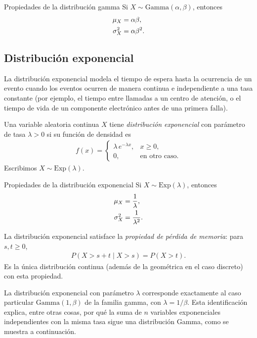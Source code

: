 {Propiedades de la distribución gamma} Si $X \sim \text{Gamma}(\alpha, \beta)$, entonces
\begin{align}
 \mu_X &= \alpha\beta, \\
 \sigma_X^2 &= \alpha\beta^2.
\end{align}

\subsection{Distribución exponencial}

La distribución exponencial modela el tiempo de espera hasta la ocurrencia de un evento
cuando los eventos ocurren de manera continua e independiente a una tasa constante (por
ejemplo, el tiempo entre llamadas a un centro de atención, o el tiempo de vida de un
componente electrónico antes de una primera falla).

\begin{definicion}
Una variable aleatoria continua $X$ tiene \emph{distribución exponencial} con parámetro
de tasa $\lambda > 0$ si su función de densidad es
\begin{align}
 \label{eq:2.8.8}
 f(x) =
 \begin{cases}
  \lambda\,e^{-\lambda x}, & x \geq 0, \\
  0, & \text{en otro caso.}
 \end{cases}
\end{align}
Escribimos $X \sim \text{Exp}(\lambda)$.
\end{definicion}

{Propiedades de la distribución exponencial} Si $X \sim \text{Exp}(\lambda)$, entonces
\begin{align}
 \mu_X &= \frac{1}{\lambda}, \\
 \sigma_X^2 &= \frac{1}{\lambda^2}.
\end{align}

\begin{observacion}
La distribución exponencial satisface la \emph{propiedad de pérdida de memoria}:
para $s, t \geq 0$,
\begin{align}
 P(X > s + t \mid X > s) = P(X > t).
\end{align}
Es la única distribución continua (además de la geométrica en el caso discreto)
con esta propiedad.
\end{observacion}

La distribución exponencial con parámetro $\lambda$ corresponde exactamente al caso
particular $\text{Gamma}(1, \beta)$ de la familia gamma, con $\lambda = 1/\beta$. Esta
identificación explica, entre otras cosas, por qué la suma de $n$ variables exponenciales
independientes con la misma tasa sigue una distribución Gamma, como se muestra a
continuación.

